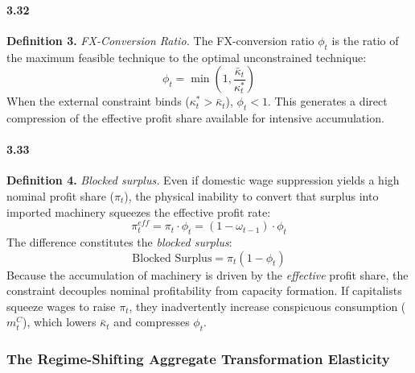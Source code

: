 \paragraph{3.32}
\textbf{Definition 3.} \textit{FX-Conversion Ratio.} The
FX-conversion ratio $\phi_t$ is the ratio of the maximum
feasible technique to the optimal unconstrained technique:
\begin{equation}
	\phi_t = \min\left(1, \frac{\bar{\kappa}_t}{\kappa_t^*}\right)
	\label{eq:33:phi}
\end{equation}
When the external constraint binds ($\kappa_t^* > \bar{\kappa}_t$),
$\phi_t < 1$. This generates a direct compression of the
effective profit share available for intensive accumulation.

\paragraph{3.33}
\textbf{Definition 4.} \textit{Blocked surplus.} Even if
domestic wage suppression yields a high nominal profit share
($\pi_t$), the physical inability to convert that surplus into
imported machinery squeezes the effective profit rate:
\begin{equation}
	\pi_t^{eff} = \pi_t \cdot \phi_t
	= (1 - \omega_{t-1}) \cdot \phi_t
	\label{eq:33:pi_eff}
\end{equation}
The difference constitutes the \textit{blocked surplus}:
\begin{equation}
	\text{Blocked Surplus} = \pi_t(1 - \phi_t)
	\label{eq:33:blocked}
\end{equation}
Because the accumulation of machinery is driven by the
\textit{effective} profit share, the
constraint decouples nominal profitability from capacity
formation. If capitalists squeeze wages to raise $\pi_t$, they
inadvertently increase conspicuous consumption ($m^C_t$),
which lowers $\bar{\kappa}_t$ and compresses $\phi_t$.

\subsubsection{The Regime-Shifting Aggregate
	Transformation Elasticity}

